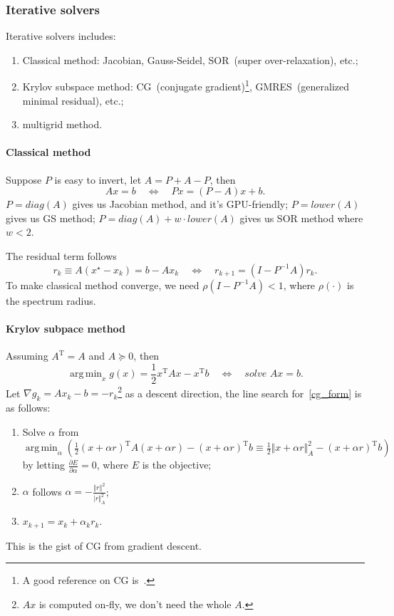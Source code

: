 \documentclass{fancydoc}
\newcommand{\trans}{\mathrm{T}}
\DeclareMathOperator*{\argmin}{arg\,min}
\begin{document}
\subsubsection{Iterative solvers}
Iterative solvers includes:
\begin{enumerate}
	\item Classical method: Jacobian, Gauss-Seidel, SOR~(super over-relaxation), etc.;
	\item Krylov subspace method: CG~(conjugate gradient)\footnote{A good reference on CG is~\cite{shewchuk1994introduction}.}, GMRES~(generalized minimal residual), etc.;
	\item multigrid method.
\end{enumerate}

\paragraph{Classical method}
Suppose $P$ is easy to invert, let $A = P+A-P$, then
\begin{equation*}
Ax=b \quad \Leftrightarrow \quad Px = (P-A)x + b.
\end{equation*} 
$P = diag(A)$ gives us Jacobian method, and it's GPU-friendly; $P = lower(A)$ gives us GS method; $P = diag(A) + w\cdot lower(A)$ gives us SOR method where $w<2$.

The residual term follows
\begin{equation*}
r_k \equiv A(x^\star - x_k) = b - Ax_k \quad \Leftrightarrow \quad r_{k+1} = (I-P^{-1}A)r_k.
\end{equation*}
To make classical method converge, we need $\rho(I - P^{-1}A) < 1$, where $\rho(\cdot)$ is the spectrum radius.

\paragraph{Krylov subpace method}


Assuming $A^\trans = A$ and $A \succeq 0$, then
\begin{equation}\label{cg_form}
\argmin_{x} g(x) = \frac{1}{2} x^\trans Ax - x^\trans b \quad \Leftrightarrow \quad solve\,\, Ax=b.
\end{equation}
Let $\nabla g_k = Ax_k - b = -r_k$\footnote{$Ax$ is computed on-fly, we don't need the whole $A$.} as a descent direction, the line search for~\eqref{cg_form} is as follows:
\begin{enumerate}
	\item Solve $\alpha$ from $\argmin_{\alpha} (\frac{1}{2} (x + \alpha r)^\trans A (x + \alpha r) - (x + \alpha r)^\trans b \equiv \frac{1}{2} \Vert x + \alpha r \Vert^2_{A} - (x+\alpha r)^\trans b)$ by letting $\frac{\partial E}{\partial \alpha} = 0$, where $E$ is the objective;
	\item $\alpha$ follows $\alpha = -\frac{\Vert r \Vert^2}{\vert r \Vert^2_A}$;
	\item $x_{k+1} = x_k + \alpha_k r_k$.
\end{enumerate}
This is the gist of CG from gradient descent.
\end{document}
